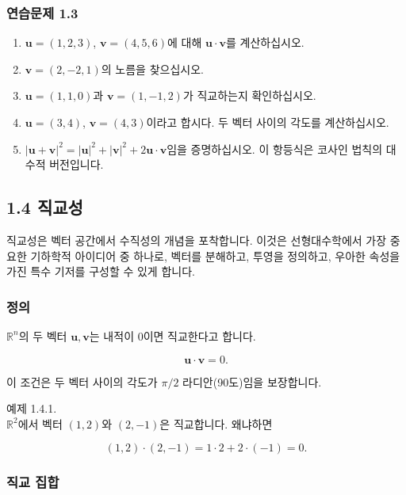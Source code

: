 \documentclass[
  12pt,
  a4paper,
]{article}
\begin{document}
\subsubsection{연습문제 1.3}\label{exercises-13}

\begin{enumerate}
\def\labelenumi{\arabic{enumi}.}
\item
  \(\mathbf{u} = (1,2,3)\), \(\mathbf{v} = (4,5,6)\)에 대해 \(\mathbf{u} \cdot \mathbf{v}\)를 계산하십시오.
\item
  \(\mathbf{v} = (2, -2, 1)\)의 노름을 찾으십시오.
\item
  \(\mathbf{u} = (1,1,0)\)과 \(\mathbf{v} = (1,-1,2)\)가 직교하는지 확인하십시오.
\item
  \(\mathbf{u} = (3,4)\), \(\mathbf{v} = (4,3)\)이라고 합시다. 두 벡터 사이의 각도를 계산하십시오.
\item
  \(|\mathbf{u} + \mathbf{v}|^2 = |\mathbf{u}|^2 + |\mathbf{v}|^2 + 2\mathbf{u}\cdot \mathbf{v}\)임을 증명하십시오. 이 항등식은 코사인 법칙의 대수적 버전입니다.
\end{enumerate}

\subsection{1.4 직교성}\label{14-orthogonality}

직교성은 벡터 공간에서 수직성의 개념을 포착합니다. 이것은 선형대수학에서 가장 중요한 기하학적 아이디어 중 하나로, 벡터를 분해하고, 투영을 정의하고, 우아한 속성을 가진 특수 기저를 구성할 수 있게 합니다.

\subsubsection{정의}\label{definition}

\(\mathbb{R}^n\)의 두 벡터 \(\mathbf{u}, \mathbf{v}\)는 내적이 0이면 직교한다고 합니다.

\[\mathbf{u} \cdot \mathbf{v} = 0.\]

이 조건은 두 벡터 사이의 각도가 \(\pi/2\) 라디안(90도)임을 보장합니다.

예제 1.4.1.\\
\(\mathbb{R}^2\)에서 벡터 \((1,2)\)와 \((2,-1)\)은 직교합니다. 왜냐하면

\[(1,2) \cdot (2,-1) = 1\cdot 2 + 2\cdot (-1) = 0.\]

\subsubsection{직교 집합}\label{orthogonal-sets}
\end{document}
